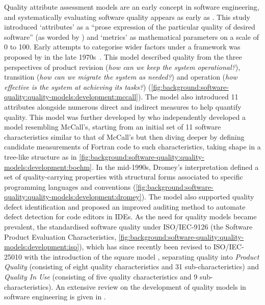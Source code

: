 Quality attribute assessment models are an early concept in software engineering, and systematically evaluating software quality appears as early as \citeyear{Rubey:1968fg} \citep{Rubey:1968fg}. This study introduced `attributes' as a ``prose expression of the particular quality of desired software'' (as worded by \citet{Boehm:1978vv}) and `metrics' as mathematical parameters on a scale of 0 to 100. 
Early attempts to categorise wider factors under a framework was proposed by \citeauthor*{McCall:1977uy} in the late 1970s~\citep{McCall:1977wm,Cavano:1978gz}. This model described quality from the three perspectives of product revision (\textit{how can we keep the system operational?}), transition (\textit{how can we migrate the system as needed?}) and operation (\textit{how effective is the system at achieving its tasks?}) (\cref{fig:background:software-quality:quality-models:development:mccall}). The model also introduced 11 attributes alongside numerous direct and indirect measures to help quantify quality.
This model was further developed by \citet{Boehm:1978vv} who independently developed a model resembling McCall's, starting from an initial set of 11 software characteristics similar to that of McCall's but then diving deeper by defining candidate measurements of Fortran code to such characteristics, taking shape in a tree-like structure as in \cref{fig:background:software-quality:quality-models:development:boehm}. 
In the mid-1990s, Dromey's interpretation \citep{Dromey:1995wy} defined a set of quality-carrying properties with structural forms associated to specific programming languages and conventions (\cref{fig:background:software-quality:quality-models:development:dromey}). The model also supported quality defect identification and proposed an improved auditing method to automate defect detection for code editors in IDEs. 
As the need for quality models became prevalent, the \citeauthor{ISO9126:1999} standardised software quality under ISO/IEC-9126 \citep{ISO9126:1999} (the Software Product Evaluation Characteristics, \cref{fig:background:software-quality:quality-models:development:iso}), which has since recently been revised to ISO/IEC-25010 with the introduction of the \gls{square} model \citep{ISO25010:2011}, separating quality into \textit{Product Quality} (consisting of eight quality characteristics and 31 sub-characteristics) and \textit{Quality In Use} (consisting of five quality characteristics and 9 sub-characteristics).
An extensive review on the development of quality models in software engineering is given in \citep{AlQutaish:2010vua}.

